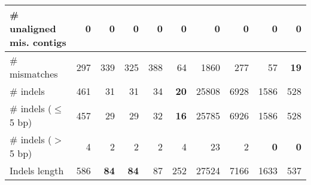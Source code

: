\documentclass[12pt,a4paper]{article}
\begin{document}
\begin{table}[ht]
\begin{center}
\begin{tabular}{|l*{9}{|r}|}
\# unaligned mis. contigs & 0 & 0 & 0 & 0 & 0 & 0 & 0 & 0 & 0 \\ \hline
\# mismatches & 297 & 339 & 325 & 388 & 64 & 1860 & 277 & 57 & {\bf 19} \\ \hline
\# indels & 461 & 31 & 31 & 34 & {\bf 20} & 25808 & 6928 & 1586 & 528 \\ \hline
\hspace{5mm}\# indels ($\leq$ 5 bp) & 457 & 29 & 29 & 32 & {\bf 16} & 25785 & 6926 & 1586 & 528 \\ \hline
\hspace{5mm}\# indels ($>$ 5 bp) & 4 & 2 & 2 & 2 & 4 & 23 & 2 & {\bf 0} & {\bf 0} \\ \hline
Indels length & 586 & {\bf 84} & {\bf 84} & 87 & 252 & 27524 & 7166 & 1633 & 537 \\ \hline
\end{tabular}
\end{center}
\end{table}
\end{document}
